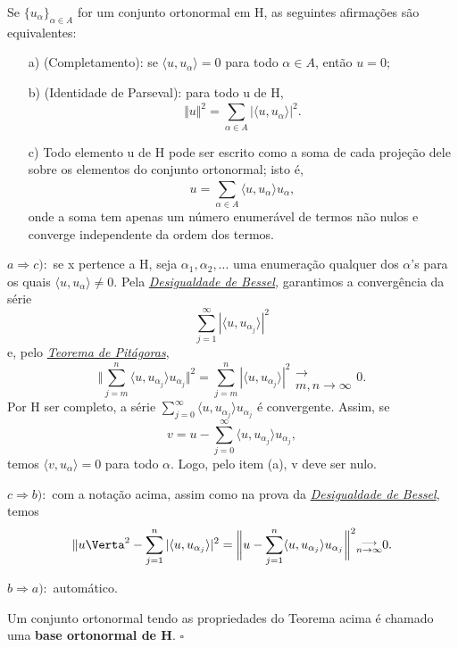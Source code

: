 \documentclass[../functional_analysis.tex]{subfiles}
\begin{document}
 \begin{theorem*}
   Se \(\{u_{\alpha }\}_{\alpha \in A}\) for um conjunto ortonormal em H, as seguintes afirmações são equivalentes:
   \begin{itemize}
     \item[a)] (Completamento): se \(\langle u, u_{\alpha } \rangle=0\) para todo \(\alpha \in A\), então \(u=0\); 
       \item[b)] \hypertarget{parseval_identity}{(Identidade de Parseval):} para todo u de H, 
         \[
           \Vert u \Vert^{2}=\sum\limits_{\alpha \in A}^{}| \langle u, u_{\alpha } \rangle |^{2}.
         \]
         \item[c)] Todo elemento u de H pode ser escrito como a soma de cada projeção dele sobre os elementos do conjunto ortonormal; isto é,
           \[
             u=\sum\limits_{\alpha \in A}^{} \langle u, u_{\alpha } \rangle u_{\alpha },
           \]
           onde a soma tem apenas um número enumerável de termos não nulos e converge independente da ordem dos termos.
   \end{itemize}
 \end{theorem*}
\begin{proof*}
  \(a \Rightarrow c):\) se x pertence a H, seja \(\alpha_1,\alpha_2,\dotsc \) uma enumeração qualquer dos \(\alpha \)'s para os quais \(\langle u, u_{\alpha } \rangle\neq 0\). Pela \hyperlink{bessel_inequality}{\textit{Desigualdade de Bessel,}} garantimos a convergência da série 
    \[
      \sum\limits_{j=1}^{\infty}| \langle u, u_{\alpha_{j}} \rangle |^{2}
    \]
    e, pelo \hyperlink{pythagorean_theorem}{\textit{Teorema de Pitágoras}}, 
      \[
        \biggl\Vert \sum\limits_{j=m}^{n}\langle u, u_{\alpha_{j}} \rangle u_{\alpha_{j}} \biggr\Vert^{2}=\sum\limits_{j=m}^{n}| \langle u, u_{\alpha_{j}} \rangle |^{2} \substack{ \\ \longrightarrow \\ m,n\to \infty}0.
      \]
      Por H ser completo, a série \(\sum\limits_{j=0}^{\infty}\langle u, u_{\alpha_{j}} \rangle u_{\alpha_{j}}\) é convergente. Assim, se 
        \[
          v= u - \sum\limits_{j=0}^{\infty}\langle u, u_{\alpha_{j}} \rangle u_{\alpha_{j}},
        \]
        temos \(\langle v, u_{\alpha } \rangle =0\) para todo \(\alpha \). Logo, pelo item (a), v deve ser nulo. 

     \(c \Rightarrow b):\) com a notação acima, assim como na prova da \hyperlink{bessel_inequality}{\textit{Desigualdade de Bessel}}, temos 
       \[
         \Vert u \Verta^{2} -\sum\limits_{j=1}^{n}| \langle u, u_{\alpha_{j}} \rangle |^{2}=\biggl\Vert u - \sum\limits_{j=1}^{n}\langle u, u_{\alpha_{j}} \rangle u_{\alpha_{j}} \biggr\Vert^{2}\substack{ \\ \longrightarrow \\ n\to \infty}0.
       \]

       \(b \Rightarrow a):\) automático. \qedsymbol 
\end{proof*}
\begin{def*}
  Um conjunto ortonormal tendo as propriedades do Teorema acima é chamado uma \textbf{base ortonormal de H}. \(\square\)
\end{def*}
\end{document}
